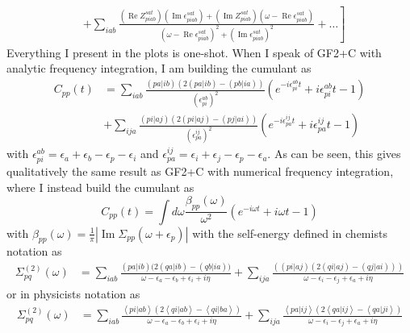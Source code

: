 \begin{align}
& \left. + \sum_{i a b} \frac{\left(\operatorname{Re} Z_{piab}^{sat}\right)\left(\operatorname{Im} \epsilon_{piab}^{sat}\right) + \left(\operatorname{Im} Z_{piab}^{sat}\right)\left(\omega - \operatorname{Re} \epsilon_{piab}^{sat}\right)}{\left(\omega - \operatorname{Re} \epsilon_{piab}^{sat}\right)^2 + \left(\operatorname{Im} \epsilon_{piab}^{sat}\right)^2} + \ldots \right]
\end{align}
Everything I present in the plots is one-shot. When I speak of GF2+C with analytic frequency integration, I am building the cumulant as
\begin{align}
    C_{pp}(t) &=\sum_{iab} \frac{(pa|ib)\left(2(pa|ib)- (pb|ia)\right)}{\left(\epsilon_{pi}^{ab}\right)^2}
\left(e^{-i \epsilon_{pi}^{ab} t} +i \epsilon_{pi}^{ab} t -1 \right)
\\&+\sum_{ija} \frac{(pi|aj)\left(2(pi|aj)- (pj|ai)\right)}{\left(\epsilon_{pa}^{ij}\right)^2} \left(e^{-i \epsilon_{pa}^{ij} t} +i \epsilon_{pa}^{ij} t -1 \right) \nonumber
\end{align}
with $\epsilon_{pi}^{ab} = \epsilon_{a}+\epsilon_{b}-\epsilon_{p}-\epsilon_{i}$ and
$\epsilon_{pa}^{ij} = \epsilon_{i}+\epsilon_{j}-\epsilon_{p}-\epsilon_{a}$.
 As can be seen, this gives qualitatively the same result as GF2+C with numerical frequency integration, where I instead build the cumulant as
\begin{equation}
    C_{pp}(t) = \int d \omega \frac{\beta_{pp}(\omega)}{\omega^2} \left( e^{-i \omega t} + i \omega t -1 \right)
\label{eq:cumulant_beta}
\end{equation}
with $\beta_{pp}(\omega) = \frac{1}{\pi} |\operatorname{Im} \Sigma_{pp}(\omega + \epsilon_p)|$ with the self-energy defined in chemists notation as
\begin{align}
    \Sigma^{(2)}_{pq}(\omega)
    & = \sum_{iab} \frac{(pa|ib)\Big(2(qa|ib) - (qb|ia)\Big)}{\omega - \epsilon_a - \epsilon_b + \epsilon_i + i \eta} + \sum_{ija} \frac{\left( (pi|aj)(2(qi|aj) - (qj|ai)) \right)}{\omega - \epsilon_i - \epsilon_j + \epsilon_a + i \eta} 
\end{align}
or in physicists notation as
\begin{align}
    \Sigma^{(2)}_{pq}(\omega)
    & = \sum_{iab} \frac{\left<pi|ab\right>\left(2\left<qi|ab\right> - \left<qi|ba\right>\right)}{\omega - \epsilon_a - \epsilon_b + \epsilon_i + i \eta} + \sum_{ija} \frac{\left<pa|ij\right>\left(2\left<qa|ij\right> - \left<qa|ji\right>\right)}{\omega - \epsilon_i - \epsilon_j + \epsilon_a + i \eta}
\end{align}
